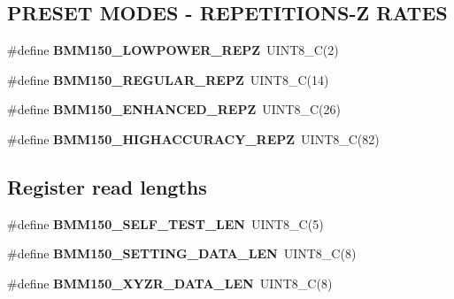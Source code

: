 \subsection*{P\+R\+E\+S\+ET M\+O\+D\+ES -\/ R\+E\+P\+E\+T\+I\+T\+I\+O\+N\+S-\/Z R\+A\+T\+ES}
\begin{DoxyCompactItemize}
\item 
\mbox{\label{group___b_m_m150_ga682d10df47d33d319c82923a6bf7bfda}} 
\#define {\bfseries B\+M\+M150\+\_\+\+L\+O\+W\+P\+O\+W\+E\+R\+\_\+\+R\+E\+PZ}~U\+I\+N\+T8\+\_\+C(2)
\item 
\mbox{\label{group___b_m_m150_ga5f230032f15c2a0e47e15fbeb3b3926d}} 
\#define {\bfseries B\+M\+M150\+\_\+\+R\+E\+G\+U\+L\+A\+R\+\_\+\+R\+E\+PZ}~U\+I\+N\+T8\+\_\+C(14)
\item 
\mbox{\label{group___b_m_m150_gadb0f53226732ebf188d21abc690f7153}} 
\#define {\bfseries B\+M\+M150\+\_\+\+E\+N\+H\+A\+N\+C\+E\+D\+\_\+\+R\+E\+PZ}~U\+I\+N\+T8\+\_\+C(26)
\item 
\mbox{\label{group___b_m_m150_ga587d2ac2387b13f243a0f5c71bb5c7aa}} 
\#define {\bfseries B\+M\+M150\+\_\+\+H\+I\+G\+H\+A\+C\+C\+U\+R\+A\+C\+Y\+\_\+\+R\+E\+PZ}~U\+I\+N\+T8\+\_\+C(82)
\end{DoxyCompactItemize}
\subsection*{Register read lengths}
\begin{DoxyCompactItemize}
\item 
\mbox{\label{group___b_m_m150_ga15617244bfffcdf36950aeaca026e93a}} 
\#define {\bfseries B\+M\+M150\+\_\+\+S\+E\+L\+F\+\_\+\+T\+E\+S\+T\+\_\+\+L\+EN}~U\+I\+N\+T8\+\_\+C(5)
\item 
\mbox{\label{group___b_m_m150_gaea226b4dde4c023c6ef6a99368a512a0}} 
\#define {\bfseries B\+M\+M150\+\_\+\+S\+E\+T\+T\+I\+N\+G\+\_\+\+D\+A\+T\+A\+\_\+\+L\+EN}~U\+I\+N\+T8\+\_\+C(8)
\item 
\mbox{\label{group___b_m_m150_gabab200d34d4e3982f583931419a95084}} 
\#define {\bfseries B\+M\+M150\+\_\+\+X\+Y\+Z\+R\+\_\+\+D\+A\+T\+A\+\_\+\+L\+EN}~U\+I\+N\+T8\+\_\+C(8)
\end{DoxyCompactItemize}
